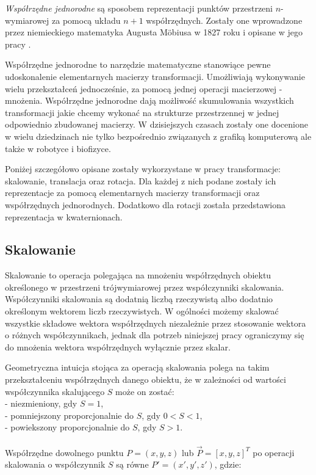 \documentclass[licencjacka]{pracamgr}
\begin{document}
\textit{Współrzędne jednorodne} są sposobem reprezentacji punktów przestrzeni $n$-wymiarowej za pomocą układu $n+1$ współrzędnych. Zostały one wprowadzone przez niemieckiego matematyka Augusta Möbiusa w 1827 roku i opisane w jego pracy \cite{mobius1827}. 

Współrzędne jednorodne to narzędzie matematyczne stanowiące pewne udoskonalenie elementarnych macierzy transformacji. Umożliwiają wykonywanie wielu przekształceń jednocześnie, za pomocą jednej operacji macierzowej - mnożenia. Współrzędne jednorodne dają możliwość skumulowania wszystkich transformacji jakie chcemy wykonać na strukturze przestrzennej w jednej odpowiednio zbudowanej macierzy. W dzisiejszych czasach zostały one docenione w wielu dziedzinach nie tylko bezpośrednio związanych z grafiką komputerową ale także w robotyce i biofizyce.

Poniżej szczegółowo opisane zostały wykorzystane w pracy transformacje: skalowanie, translacja oraz rotacja. Dla każdej z nich podane zostały ich reprezentacje za pomocą elementarnych macierzy transformacji oraz współrzędnych jednorodnych. Dodatkowo dla rotacji została przedstawiona reprezentacja w kwaternionach.

\subsection{Skalowanie}
Skalowanie to operacja polegająca na mnożeniu współrzędnych obiektu określonego w przestrzeni trójwymiarowej przez współczynniki skalowania. Współczynniki skalowania są dodatnią liczbą rzeczywistą albo dodatnio określonym wektorem liczb rzeczywistych. W ogólności możemy skalować wszystkie składowe wektora współrzędnych niezależnie przez stosowanie wektora o różnych współczynnikach, jednak dla potrzeb niniejszej pracy ograniczymy się do mnożenia wektora współrzędnych wyłącznie przez skalar.

Geometryczna intuicja stojąca za operacją skalowania polega na takim przekształceniu współrzędnych danego obiektu, że w zależności od wartości współczynnika skalującego $S$ może on zostać: 
\\
- niezmieniony, gdy $S=1$,
\\
- pomniejszony proporcjonalnie do $S$, gdy $0<S<1$,
\\
- powiekszony proporcjonalnie do $S$, gdy $S>1$.
\\
\\
Współrzędne dowolnego punktu $P=(x,y,z)$ lub $\vec{P}=[x, y, z]^T$ po operacji skalowania o współczynnik $S$ są równe $P'=(x',y',z')$, gdzie:
\end{document}
